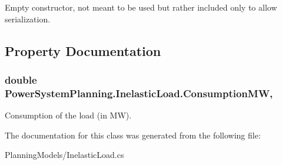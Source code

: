 Empty constructor, not meant to be used but rather included only to allow serialization. 



\subsection{Property Documentation}
\subsubsection[{\texorpdfstring{Consumption\+MW}{ConsumptionMW}}]{\setlength{\rightskip}{0pt plus 5cm}double Power\+System\+Planning.\+Inelastic\+Load.\+Consumption\+MW\hspace{0.3cm}{\ttfamily [get]}, {\ttfamily [set]}}\hypertarget{class_power_system_planning_1_1_inelastic_load_ad37cc0084cc3307039345b7d683bd51d}{}\label{class_power_system_planning_1_1_inelastic_load_ad37cc0084cc3307039345b7d683bd51d}


Consumption of the load (in MW). 



The documentation for this class was generated from the following file\+:\begin{DoxyCompactItemize}
\item 
Planning\+Models/Inelastic\+Load.\+cs\end{DoxyCompactItemize}
